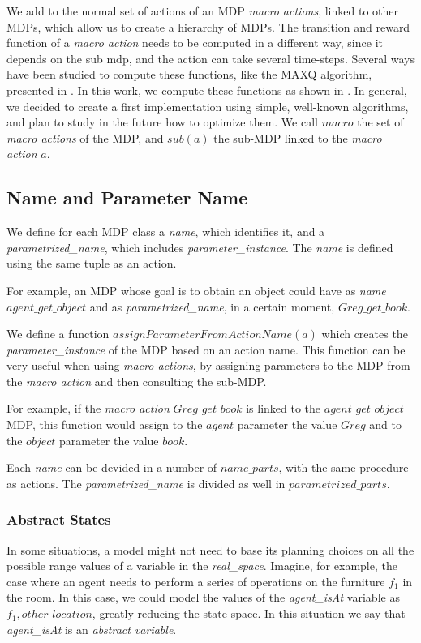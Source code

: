 We add to the normal set of actions of an MDP \textit{macro actions}, linked to other MDPs, which allow us to create a hierarchy of MDPs. The transition and reward function of a \textit{macro action} needs to be computed in a different way, since it depends on the sub mdp, and the action can take several time-steps. Several ways have been studied to compute these functions, like the MAXQ algorithm, presented in \cite{dietterich2000hierarchical}. In this work, we compute these functions as shown in \cite{hauskrecht1998hierarchical}. In general, we decided to create a first implementation using simple, well-known algorithms, and plan to study in the future how to optimize them. We call $macro$ the set of \textit{macro actions} of the MDP, and $sub(a)$ the sub-MDP linked to the \textit{macro action} $a$.

\subsection{Name and Parameter Name}
We define for each MDP class a \textit{name}, which identifies it, and a \textit{parametrized\_name}, which includes \textit{parameter\_instance}. The \textit{name} is defined using the same tuple as an action. 

For example, an MDP whose goal is to obtain an object could have as \textit{name} $agent\_get\_object$ and as \textit{parametrized\_name}, in a certain moment, $Greg\_get\_book$.

We define a function $assignParameterFromActionName(a)$ which creates the \textit{parameter\_instance} of the MDP based on an action name. This function can be very useful when using \textit{macro actions}, by assigning parameters to the MDP from the \textit{macro action} and then consulting the sub-MDP.

For example, if the \textit{macro action} $Greg\_get\_book$ is linked to the $agent\_get\_object$ MDP, this function would assign to the $agent$ parameter the value $Greg$ 
and to the $object$ parameter the value $book$.

Each \textit{name} can be devided in a number of $name\_parts$,  with the same procedure as actions. The \textit{parametrized\_name} is divided as well in $parametrized\_parts$.


\subsubsection{Abstract States}

In some situations, a model might not need to base its planning choices on all the possible range values of a variable in the \textit{real\_space}. Imagine, for example, the case where an agent needs to perform a series of operations on the furniture $f_1$ in the room. In this case, we could model the  values of the \textit{agent\_isAt} variable as ${f_1 , other\_location}$, greatly reducing the state space. In this situation we say that \textit{agent\_isAt} is an \textit{abstract variable}. 

